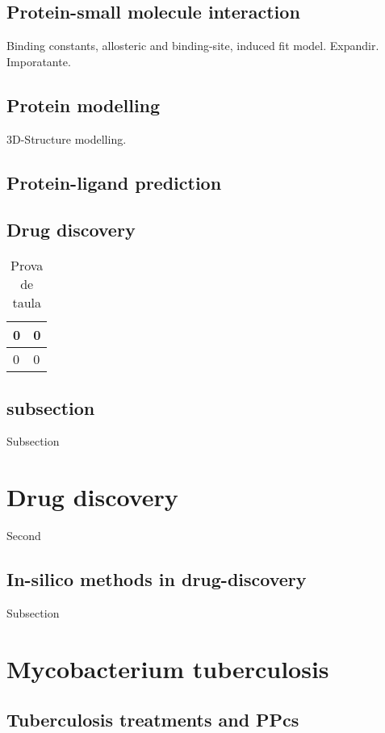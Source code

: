 \documentclass[12pt, a4paper,twoside]{tesi_upf}
\begin{document}
\subsection{Protein-small molecule interaction} \label{ligand_intect}

Binding constants, allosteric and binding-site, induced fit model. Expandir. Imporatante. 

\subsection{Protein modelling}

3D-Structure modelling. 




\subsection{Protein-ligand prediction}


\subsection{Drug discovery}



\begin{table}[h]
  \centering
  \begin{tabular}{|l|l|}
   \hline
    0 & 0 \\ \hline
    0 & 0 \\ \hline    
  \end{tabular}
  \caption{Prova de taula}

\end{table}

\subsection{subsection}
Subsection

\section{Drug discovery}
Second
\subsection{In-silico methods in drug-discovery}
Subsection
\section{Mycobacterium tuberculosis}
\subsection{Tuberculosis treatments and PPcs}
\end{document}

